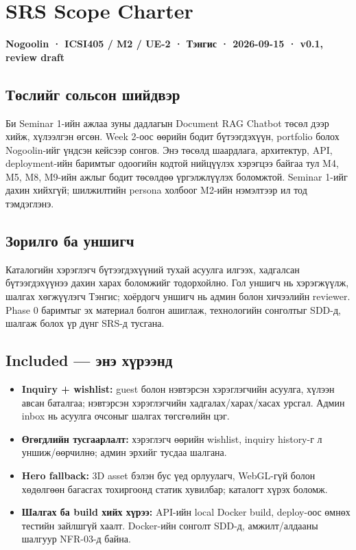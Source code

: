 \section{SRS Scope Charter}\label{doc1-srs-scope-charter}

\textbf{Nogoolin · ICSI405 / M2 / UE-2 · Тэнгис · 2026-09-15 · v0.1,
review draft}

\subsection{Төслийг сольсон
шийдвэр}\label{doc1-ux442ux4e9ux441ux43bux438ux439ux433-ux441ux43eux43bux44cux441ux43eux43d-ux448ux438ux439ux434ux432ux44dux440}

Би Seminar 1-ийн ажлаа зуны дадлагын Document RAG Chatbot төсөл дээр
хийж, хүлээлгэн өгсөн. Week 2-оос өөрийн бодит бүтээгдэхүүн, portfolio
болох Nogoolin-ийг үндсэн кейсээр сонгов. Энэ төсөлд шаардлага,
архитектур, API, deployment-ийн баримтыг одоогийн кодтой нийцүүлэх
хэрэгцээ байгаа тул M4, M5, M8, M9-ийн ажлыг бодит төсөлдөө үргэлжлүүлэх
боломжтой. Seminar 1-ийг дахин хийхгүй; шилжилтийн persona холбоог
M2-ийн нэмэлтээр ил тод тэмдэглэнэ.

\subsection{Зорилго ба
уншигч}\label{doc1-ux437ux43eux440ux438ux43bux433ux43e-ux431ux430-ux443ux43dux448ux438ux433ux447}

Каталогийн хэрэглэгч бүтээгдэхүүний тухай асуулга илгээх, хадгалсан
бүтээгдэхүүнээ дахин харах боломжийг тодорхойлно. Гол уншигч нь
хэрэгжүүлж, шалгах хөгжүүлэгч Тэнгис; хоёрдогч уншигч нь админ болон
хичээлийн reviewer. Phase 0 баримтыг эх материал болгон ашиглаж,
технологийн сонголтыг SDD-д, шалгаж болох үр дүнг SRS-д тусгана.

\subsection{Included --- энэ
хүрээнд}\label{doc1-included-ux44dux43dux44d-ux445ux4afux440ux44dux44dux43dux434}

\begin{itemize}
\tightlist
\item
  \textbf{Inquiry + wishlist:} guest болон нэвтэрсэн хэрэглэгчийн
  асуулга, хүлээн авсан баталгаа; нэвтэрсэн хэрэглэгчийн
  хадгалах/харах/хасах урсгал. Админ inbox нь асуулга очсоныг шалгах
  төгсгөлийн цэг.
\item
  \textbf{Өгөгдлийн тусгаарлалт:} хэрэглэгч өөрийн wishlist, inquiry
  history-г л уншиж/өөрчилнө; админ эрхийг тусдаа шалгана.
\item
  \textbf{Hero fallback:} 3D asset бэлэн бус үед орлуулагч, WebGL-гүй
  болон хөдөлгөөн багасгах тохиргоонд статик хувилбар; каталогт хүрэх
  боломж.
\item
  \textbf{Шалгах ба build хийх хүрээ:} API-ийн local Docker build,
  deploy-оос өмнөх тестийн зайлшгүй хаалт. Docker-ийн сонголт SDD-д,
  амжилт/алдааны шалгуур NFR-03-д байна.
\end{itemize}

